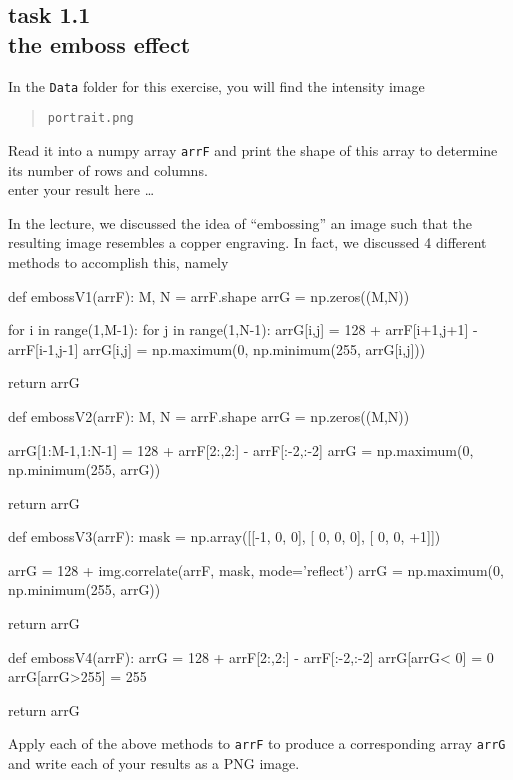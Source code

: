 
\subsection*{task 1.1 \\[1ex] the emboss effect}

In the \texttt{Data} folder for this exercise, you will find the intensity image
\begin{quote}
    \texttt{portrait.png}
\end{quote}
Read it into a numpy array \texttt{arrF} and print the shape of this array to determine its number of rows and columns.
\color{blue} \\[1ex]
enter your result here \ldots
\color{black}

In the lecture, we discussed the idea of ``embossing'' an image such that the resulting image resembles a copper engraving. In fact, we discussed 4 different methods to accomplish this, namely
\begin{python}[emph={embossV1,embossV2,embossV3,embossV4}]
def embossV1(arrF):
    M, N = arrF.shape
    arrG = np.zeros((M,N))

    for i in range(1,M-1):
        for j in range(1,N-1):
            arrG[i,j] = 128 + arrF[i+1,j+1] - arrF[i-1,j-1]
            arrG[i,j] = np.maximum(0, np.minimum(255, arrG[i,j]))

    return arrG


def embossV2(arrF):
    M, N = arrF.shape
    arrG = np.zeros((M,N))
    
    arrG[1:M-1,1:N-1] = 128 + arrF[2:,2:] - arrF[:-2,:-2]
    arrG = np.maximum(0, np.minimum(255, arrG))

    return arrG


def embossV3(arrF):
    mask = np.array([[-1, 0,  0],
                     [ 0, 0,  0],
                     [ 0, 0, +1]])

    arrG = 128 + img.correlate(arrF, mask, mode='reflect')
    arrG = np.maximum(0, np.minimum(255, arrG))

    return arrG
    
  
def embossV4(arrF):
    arrG = 128 + arrF[2:,2:] - arrF[:-2,:-2]
    arrG[arrG<  0] =   0
    arrG[arrG>255] = 255

    return arrG
\end{python}

\newpage

Apply each of the above methods to \texttt{arrF} to produce a corresponding array \texttt{arrG} and write each of your results as a PNG image.

